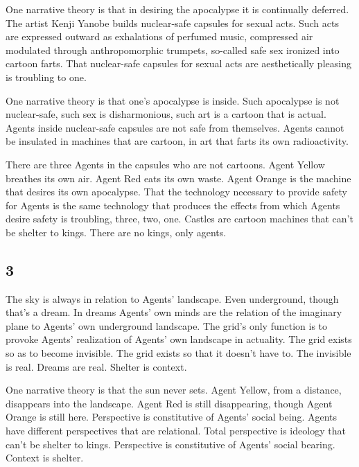 One narrative theory is that in desiring the apocalypse it is
continually deferred. The artist Kenji Yanobe builds nuclear-safe
capsules for sexual acts. Such acts are expressed outward as exhalations
of perfumed music, compressed air modulated through anthropomorphic
trumpets, so-called safe sex ironized into cartoon farts. That
nuclear-safe capsules for sexual acts are aesthetically pleasing is
troubling to one.

One narrative theory is that one's apocalypse is inside. Such apocalypse
is not nuclear-safe, such sex is disharmonious, such art is a cartoon
that is actual. Agents inside nuclear-safe capsules are not safe from
themselves. Agents cannot be insulated in machines that are cartoon, in
art that farts its own radioactivity.

There are three Agents in the capsules who are not cartoons. Agent
Yellow breathes its own air. Agent Red eats its own waste. Agent Orange
is the machine that desires its own apocalypse. That the technology
necessary to provide safety for Agents is the same technology that
produces the effects from which Agents desire safety is troubling,
three, two, one. Castles are cartoon machines that can't be shelter to
kings. There are no kings, only agents.

\hypertarget{section-4}{%
\subsection{3}\label{section-4}}

The sky is always in relation to Agents' landscape. Even underground,
though that's a dream. In dreams Agents' own minds are the relation of
the imaginary plane to Agents' own underground landscape. The grid's
only function is to provoke Agents' realization of Agents' own landscape
in actuality. The grid exists so as to become invisible. The grid exists
so that it doesn't have to. The invisible is real. Dreams are real.
Shelter is context.

One narrative theory is that the sun never sets. Agent Yellow, from a
distance, disappears into the landscape. Agent Red is still
disappearing, though Agent Orange is still here. Perspective is
constitutive of Agents' social being. Agents have different perspectives
that are relational. Total perspective is ideology that can't be shelter
to kings. Perspective is constitutive of Agents' social bearing. Context
is shelter.

